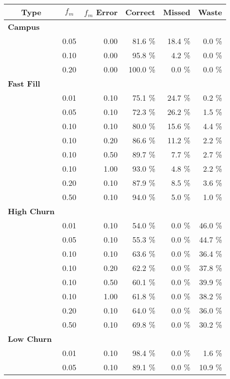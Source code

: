 \begin{table}[t!]
\begin{threeparttable}
{\small
\begin{tabularx}{\columnwidth}{Xrrrrr}
\multicolumn{1}{c}{\textbf{Type}} & 
\multicolumn{1}{c}{\textbf{$f_m$}} & 
\multicolumn{1}{c}{\textbf{$f_m$ Error}} & 
\multicolumn{1}{c}{\textbf{Correct}} & 
\multicolumn{1}{c}{\textbf{Missed}} & 
\multicolumn{1}{c}{\textbf{Waste}}\\ \toprule

\textbf{Campus} & & & & & \\
\midrule
& 0.05 & 0.00 & 81.6 \% & 18.4 \% & 0.0 \% \\
& 0.10 & 0.00 & 95.8 \% & 4.2 \% & 0.0 \% \\
& 0.20 & 0.00 & 100.0 \% & 0.0 \% & 0.0 \% \\
\textbf{Fast Fill} & & & & & \\
\midrule
& 0.01 & 0.10 & 75.1 \% & 24.7 \% & 0.2 \% \\
& 0.05 & 0.10 & 72.3 \% & 26.2 \% & 1.5 \% \\
& 0.10 & 0.10 & 80.0 \% & 15.6 \% & 4.4 \% \\
& 0.10 & 0.20 & 86.6 \% & 11.2 \% & 2.2 \% \\
& 0.10 & 0.50 & 89.7 \% & 7.7 \% & 2.7 \% \\
& 0.10 & 1.00 & 93.0 \% & 4.8 \% & 2.2 \% \\
& 0.20 & 0.10 & 87.9 \% & 8.5 \% & 3.6 \% \\
& 0.50 & 0.10 & 94.0 \% & 5.0 \% & 1.0 \% \\
\textbf{High Churn} & & & & & \\
\midrule
& 0.01 & 0.10 & 54.0 \% & 0.0 \% & 46.0 \% \\
& 0.05 & 0.10 & 55.3 \% & 0.0 \% & 44.7 \% \\
& 0.10 & 0.10 & 63.6 \% & 0.0 \% & 36.4 \% \\
& 0.10 & 0.20 & 62.2 \% & 0.0 \% & 37.8 \% \\
& 0.10 & 0.50 & 60.1 \% & 0.0 \% & 39.9 \% \\
& 0.10 & 1.00 & 61.8 \% & 0.0 \% & 38.2 \% \\
& 0.20 & 0.10 & 64.0 \% & 0.0 \% & 36.0 \% \\
& 0.50 & 0.10 & 69.8 \% & 0.0 \% & 30.2 \% \\
\textbf{Low Churn} & & & & & \\
\midrule
& 0.01 & 0.10 & 98.4 \% & 0.0 \% & 1.6 \% \\
& 0.05 & 0.10 & 89.1 \% & 0.0 \% & 10.9 \% \\

\end{tabularx}}
\end{threeparttable}
\end{table}
